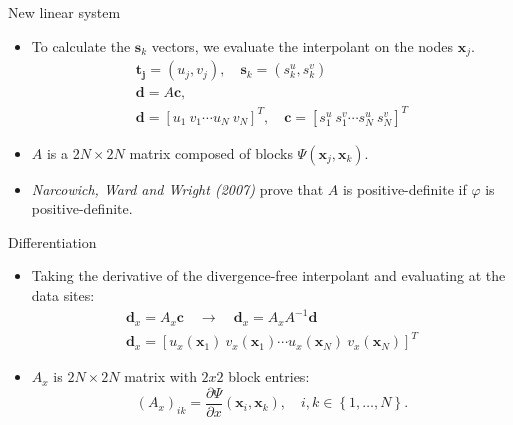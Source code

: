\documentclass{beamer}
\begin{document}
\begin{frame}{New linear system}
  \begin{itemize}
    \item To calculate the $\mathbf{s}_k$ vectors, we evaluate the interpolant
      on the nodes $\mathbf{x}_j$.
      \begin{gather*}
        \mathbf{t_j} = (u_j,v_j), \quad \mathbf{s}_k = (s_k^u,s_k^v)\\
        \mathbf{d} = A\mathbf{c},\\
        \mathbf{d} = [u_1 \ v_1 \cdots u_N \ v_N]^{T}, \quad
        \mathbf{c} = [s_1^u \ s_1^v \cdots s_N^u \ s_N^v]^{T}
      \end{gather*}

    \item $A$ is a $2N\times 2N$ matrix composed of blocks $\Psi(\mathbf{x}_j,
      \mathbf{x}_k)$.

    \item \emph{Narcowich, Ward and Wright (2007)} prove that $A$ is positive-definite
      if $\varphi$ is positive-definite.
    \end{itemize}
\end{frame}

\begin{frame}{Differentiation}
  \begin{itemize}
    \item Taking the derivative of the divergence-free interpolant and
      evaluating at the data sites:
      \begin{gather*}
	\mathbf{d}_x = A_x\mathbf{c} \quad \rightarrow \quad \mathbf{d}_x =
	A_x A^{-1}\mathbf{d} \\
	\mathbf{d}_x = [u_x(\mathbf{x}_1) \ v_x(\mathbf{x}_1) \cdots 
	u_x(\mathbf{x}_N) \ v_x(\mathbf{x}_N)]^T
      \end{gather*}

    \item $A_x$ is $2N\times 2N$ matrix with $2x2$ block entries:
      \begin{equation*}
        (A_x)_{ik} = \frac{\partial \Psi}{\partial x}
	(\mathbf{x}_i,\mathbf{x}_k), \quad i,k \in \left\{1,\ldots,N\right\}.
      \end{equation*}
  \end{itemize}
\end{frame}
\end{document}
